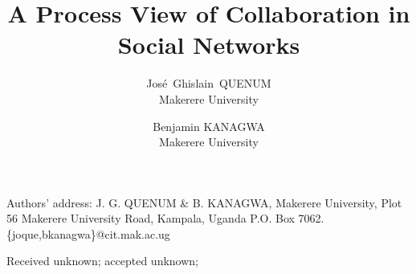 \documentclass[acmjacm]{acmtrans2m}
\title{A Process View of Collaboration in Social Networks}
\author{ Jos\'{e}~Ghislain~QUENUM\\Makerere University \and Benjamin KANAGWA\\Makerere University}
\begin{document}
	
	\begin{bottomstuff}
	Authors' address: J. G. QUENUM \& B. KANAGWA, 
	Makerere University,
	Plot 56 Makerere University Road, Kampala, Uganda
	P.O. Box 7062.\newline
	\{joque,bkanagwa\}@cit.mak.ac.ug
	\end{bottomstuff}
	
\maketitle












\begin{received}
	Received unknown;
	accepted unknown;
\end{received}
\end{document}
